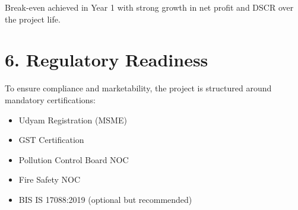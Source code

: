 \vspace{0.5cm}
\noindent\textcolor{green}{\checkmark} Break-even achieved in Year 1 with strong growth in net profit and DSCR over the project life.

\vspace{0.8cm}
\section*{6. Regulatory Readiness}

To ensure compliance and marketability, the project is structured around mandatory certifications:

\begin{itemize}[label=\textcolor{green}{\checkmark}]
    \item Udyam Registration (MSME)
    \item GST Certification
    \item Pollution Control Board NOC
    \item Fire Safety NOC
    \item BIS IS 17088:2019 (optional but recommended)
\end{itemize}
